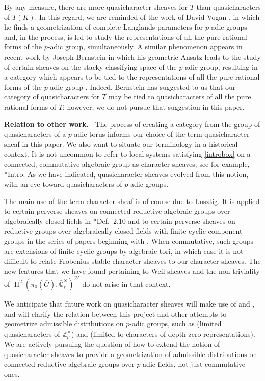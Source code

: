 \documentclass[10pt]{amsart}
\theoremstyle{plain}
\theoremstyle{definition}
\newcommand{\ZZ}{{\mathbb{Z}}}
\newcommand{\EE}{\mathbb{\bar Q}_\ell}
\newcommand{\EEx}{\EE^\times}
\newcommand{\Weil}[1]{\mathcal{W}_{#1}}
\DeclareMathOperator{\Hh}{H}
\newcommand{\bG}{\bar{G}}
\begin{document}
By any measure, there are more quasicharacter sheaves for $T$ than quasicharacters of $T(K)$.  
In this regard, we are reminded of the work of David Vogan \cite{vogan:93a}, in which he finds a geometrization of complete Langlands parameters for $p$-adic groups 
and, in the process, is led to study the representations of all the pure rational forms of the $p$-adic group, simultaneously.
A similar phenomenon appears in recent work by Joseph Bernstein in which his geometric Ansatz leads to the study of certain sheaves on the stacky classifying space of the $p$-adic group, resulting in a category which appears to be tied to the representations of all the pure rational forms of the $p$-adic group \cite{bernstein:vogan_conference}.
Indeed, Bernstein has suggested to us that our category of quasicharacters for $T$ may be tied to quasicharacters of all the pure rational forms of $T$; however, we do not pursue that suggestion in this paper.

\medskip
\noindent\textbf{Relation to other work.\ }
The process of creating a category from the group of quasicharacters of a $p$-adic  torus informs our choice of the term quasicharacter sheaf in this paper.
We also want to situate our terminology in a historical context.
It is not uncommon to refer to local systems satisfying \eqref{introbox} on a connected, commutative algebraic group as character sheaves;
see for example, \cite{kamgarpour:09a}*{Intro}.
As we have indicated, quasicharacter sheaves evolved from this notion,
with an eye toward quasicharacters of $p$-adic groups.

The main use of the term character sheaf is of course due to Lusztig.
It is applied to certain perverse sheaves on connected reductive algebraic groups over algebraically closed fields in
\cite{lusztig:85a}*{Def.~2.10} and to certain perverse sheaves on reductive groups
over algebraically closed fields with finite cyclic component groups in the series of papers
beginning with \cite{lusztig:disconnected1}.
When commutative, such groups are extensions of finite cyclic groups by algebraic tori,
in which case it is not difficult to relate Frobenius-stable character sheaves to our character sheaves. %
The new features that we have found pertaining to Weil sheaves and the non-triviality of $\Hh^2(\pi_0(\bG),\EEx)^{\Weil{}}$ do not arise in that context.

We anticipate that future work on quasicharacter sheaves will make use of   \cite{suzuki-yoshida:12a} and \cite{Suzuki:Neron}, and will clarify the relation between this project and other attempts to geometrize admissible distributions on $p$-adic groups, such as \cite{Cunningham-Kamgarpour} (limited quasicharacters of $\ZZ_p^\times$) and \cite{Aubert-Cunningham} (limited to characters of depth-zero representations). 
We are actively pursuing the question of how to extend the notion of quasicharacter sheaves to provide a geometrization of admissible distributions on connected reductive algebraic groups over $p$-adic fields, not just commutative ones.
\end{document}
